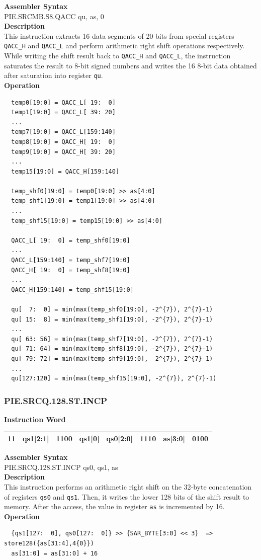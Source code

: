 \textbf{Assembler Syntax} \\
PIE.SRCMB.S8.QACC qu, as, 0 \\
\textbf{Description} \\
This instruction extracts 16 data segments of 20 bits from special registers \lstinline{QACC_H} and \lstinline{QACC_L} and perform arithmetic right shift operations respectively. While writing the shift result back to \lstinline{QACC_H} and \lstinline{QACC_L}, the instruction saturates the result to 8-bit signed numbers and writes the 16 8-bit data obtained after saturation into register \lstinline{qu}.\\
\textbf{Operation}
\begin{lstlisting}
  temp0[19:0] = QACC_L[ 19:  0]
  temp1[19:0] = QACC_L[ 39: 20]
  ...
  temp7[19:0] = QACC_L[159:140]
  temp8[19:0] = QACC_H[ 19:  0]
  temp9[19:0] = QACC_H[ 39: 20]
  ...
  temp15[19:0] = QACC_H[159:140]

  temp_shf0[19:0] = temp0[19:0] >> as[4:0]
  temp_shf1[19:0] = temp1[19:0] >> as[4:0]
  ...
  temp_shf15[19:0] = temp15[19:0] >> as[4:0]

  QACC_L[ 19:  0] = temp_shf0[19:0]
  ...
  QACC_L[159:140] = temp_shf7[19:0]
  QACC_H[ 19:  0] = temp_shf8[19:0]
  ...
  QACC_H[159:140] = temp_shf15[19:0]

  qu[  7:  0] = min(max(temp_shf0[19:0], -2^{7}), 2^{7}-1)
  qu[ 15:  8] = min(max(temp_shf1[19:0], -2^{7}), 2^{7}-1)
  ...
  qu[ 63: 56] = min(max(temp_shf7[19:0], -2^{7}), 2^{7}-1)
  qu[ 71: 64] = min(max(temp_shf8[19:0], -2^{7}), 2^{7}-1)
  qu[ 79: 72] = min(max(temp_shf9[19:0], -2^{7}), 2^{7}-1)
  ...
  qu[127:120] = min(max(temp_shf15[19:0], -2^{7}), 2^{7}-1)
\end{lstlisting}

\newpage
\subsubsection{PIE.SRCQ.128.ST.INCP}\label{instruction:PIESRCQ128STINCP}
\setlength\tabcolsep{6pt}
\textbf{Instruction Word} \\
\begin{tabular}{|c|c|c|c|c|c|c|c|}
	\hline
	11 & qs1[2:1] & 1100 & qs1[0] & qs0[2:0] & 1110 & as[3:0] & 0100 \\
	\hline
\end{tabular}

\textbf{Assembler Syntax} \\
PIE.SRCQ.128.ST.INCP qs0, qs1, as \\
\textbf{Description} \\
This instruction performs an arithmetic right shift on the 32-byte concatenation of registers \lstinline{qs0} and \lstinline{qs1}. Then, it writes the lower 128 bits of the shift result to memory. After the access, the value in register \lstinline{as} is incremented by 16.\\
\textbf{Operation}
\begin{lstlisting}
  {qs1[127:  0], qs0[127:  0]} >> {SAR_BYTE[3:0] << 3}  => store128({as[31:4],4{0}})
  as[31:0] = as[31:0] + 16
\end{lstlisting}

